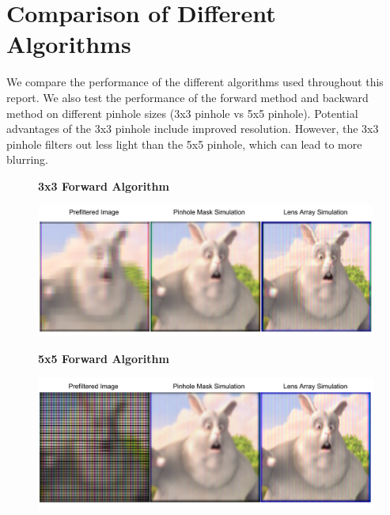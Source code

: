 \chapter{Comparison of Different Algorithms}


We compare the performance of the different algorithms used throughout this report. We also test the performance of the forward method and backward method on different pinhole sizes (3x3 pinhole vs 5x5 pinhole). Potential advantages of the 3x3 pinhole include improved resolution. However, the 3x3 pinhole filters out less light than the 5x5 pinhole, which can lead to more blurring.  

\begin{figure}
    \centering
    \textbf{3x3 Forward Algorithm}\par\medskip
    \includegraphics[width=6in]{chapters/chapter9/images/3x3_forward.png}
\end{figure}

\begin{figure}
    \centering
    \textbf{5x5 Forward Algorithm}\par\medskip
    \includegraphics[width=6in]{chapters/chapter9/images/5x5_forward.png}
\end{figure}

